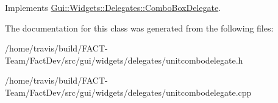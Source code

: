 Implements \hyperlink{classGui_1_1Widgets_1_1Delegates_1_1ComboBoxDelegate_a0b7f0752890cd3fb257361a7990a74c2}{Gui\-::\-Widgets\-::\-Delegates\-::\-Combo\-Box\-Delegate}.



The documentation for this class was generated from the following files\-:\begin{DoxyCompactItemize}
\item 
/home/travis/build/\-F\-A\-C\-T-\/\-Team/\-Fact\-Dev/src/gui/widgets/delegates/unitcombodelegate.\-h\item 
/home/travis/build/\-F\-A\-C\-T-\/\-Team/\-Fact\-Dev/src/gui/widgets/delegates/unitcombodelegate.\-cpp\end{DoxyCompactItemize}
